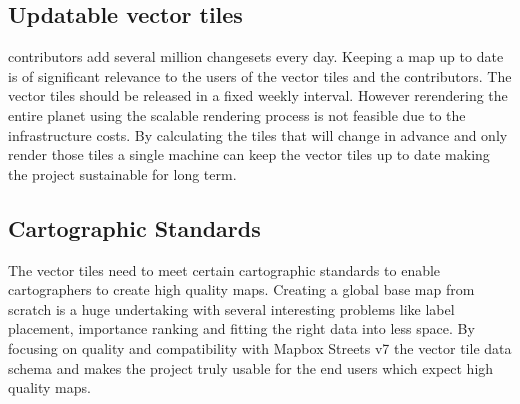 \subsection{Updatable vector tiles}

\osm{} contributors add several million changesets every day. Keeping a map up to date is of significant relevance to the users of the vector tiles and the contributors. The vector tiles should be released in a fixed weekly interval.
However rerendering the entire planet using the scalable rendering process is not feasible due to the infrastructure costs. By calculating the tiles that will change in advance and only render those tiles a single machine can keep the vector tiles up to date making the project sustainable for long term. 


\subsection{Cartographic Standards}

The vector tiles need to meet certain cartographic standards to enable cartographers to create high quality maps. Creating a global base map from scratch is a huge undertaking with several interesting problems like label placement, importance ranking and fitting the right data into less space. By focusing on quality and compatibility with Mapbox Streets v7 the vector tile data schema and makes the project truly usable for the end users which expect high quality maps.
